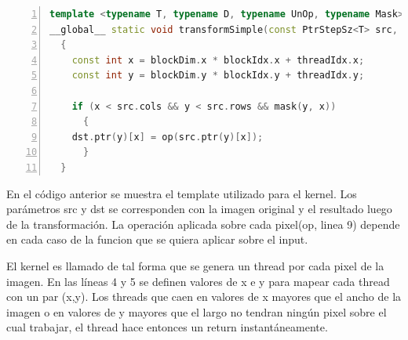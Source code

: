 \documentclass[a4paper,10pt]{report}
\begin{document}

\begin{lstlisting}[frame=bt,caption={gpu/include/opencv2/gpu/device/detail/transform\_detail.hpp},label={templateKernel},
columns=fullflexible,numbers=left,backgroundcolor=\color{LemonChiffon1},basicstyle=\footnotesize,keywordstyle=\ttfamily\footnotesize,language=C++,stringstyle=\ttfamily,breaklines=true,xleftmargin=0.5em,xrightmargin=0pt,aboveskip=\bigskipamount,belowskip=\bigskipamount]
template <typename T, typename D, typename UnOp, typename Mask>
__global__ static void transformSimple(const PtrStepSz<T> src, PtrStep<D> dst, const Mask mask, const UnOp op)
  {
    const int x = blockDim.x * blockIdx.x + threadIdx.x;
    const int y = blockDim.y * blockIdx.y + threadIdx.y;

    if (x < src.cols && y < src.rows && mask(y, x))
      {
	dst.ptr(y)[x] = op(src.ptr(y)[x]);
      }
  }

\end{lstlisting}

En el código anterior se muestra el template utilizado para el kernel.
Los parámetros src y dst se corresponden con la imagen original y el resultado luego de la transformación.
La operación aplicada sobre cada pixel(op, linea 9) depende en cada caso de la funcion que se quiera aplicar sobre el input.

El kernel es llamado de tal forma que se genera un thread por cada pixel de la imagen.
En las líneas 4 y 5 se definen valores de x e y para mapear cada thread con un par (x,y).
Los threads que caen en valores de x mayores que el ancho de la imagen o en valores de y mayores que el largo no tendran ningún pixel sobre el cual trabajar, el thread hace entonces un return instantáneamente.




\end{document}
